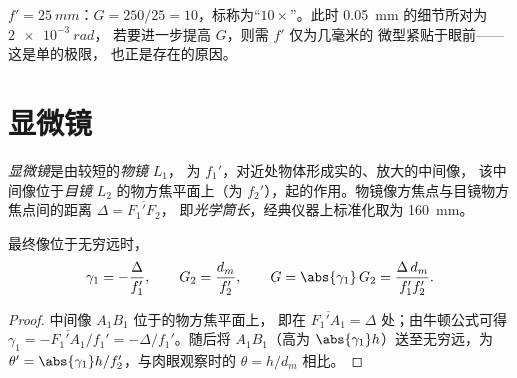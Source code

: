 \begin{example}[钟表匠的放大镜]\label{ex:b1:optical-instruments:loupe}
$f' = \qty{25}{mm}$：$G = 250/25 = 10$，标称为“$10\times$”。此时
\qty{0.05}{mm} 的细节所对为 $\qty{2e-3}{rad}$，
若要进一步提高 $G$，则需 $f'$ 仅为几毫米的
微型紧贴于眼前——这是单的极限，
也正是存在的原因。
\end{example}

\section{显微镜}

\begin{definition}[复式显微镜]\label{def:b1:optical-instruments:microscope}
\emph{显微镜}是由较短的\emph{物镜} $L_1$，
为 $f_1'$，对近处物体形成实的、放大的中间像，
该中间像位于\emph{目镜} $L_2$ 的物方焦平面上（为
$f_2'$），起的作用。物镜像方焦点与目镜物方焦点间的距离 $\Delta =
\overline{F_1'F_2}$，
即\emph{光学筒长}，经典仪器上标准化取为
\qty{160}{mm}。
\end{definition}

\begin{proposition}[显微镜的放大率]\label{prop:b1:optical-instruments:microscope}
最终像位于无穷远时，
\[
\gamma_1 = -\frac{\Delta}{f_1'}, \qquad G_2 = \frac{d_m}{f_2'},
\qquad G = \abs{\gamma_1}\,G_2 = \frac{\Delta\,d_m}{f_1' f_2'} .
\]
\end{proposition}

\begin{proof}
中间像 $A_1B_1$ 位于的物方焦平面上，
即在 $\overline{F_1'A_1} = \Delta$ 处；由牛顿公式可得
$\gamma_1 = -\overline{F_1'A_1}/f_1' = -\Delta/f_1'$。随后将
$A_1B_1$（高为 $\abs{\gamma_1} h$）送至无穷远，为
$\theta' = \abs{\gamma_1} h/f_2'$，与肉眼观察时的
$\theta = h/d_m$ 相比。
\end{proof}

